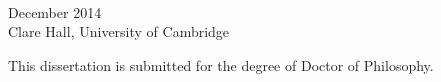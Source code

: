 
\begin{titlepage}

\begin{addmargin}[-1cm]{-3cm}
\begin{center}
\large

\hfill
\vfill

\begingroup
\color{Maroon} \\ \bigskip 
\endgroup


\vfill
\vspace{7em}

December 2014 \\
\medskip
Clare Hall, University of Cambridge

\vspace{2em}


{\small This dissertation is submitted for the degree of Doctor of Philosophy.}


\vfill

\end{center}
\end{addmargin}

\end{titlepage}